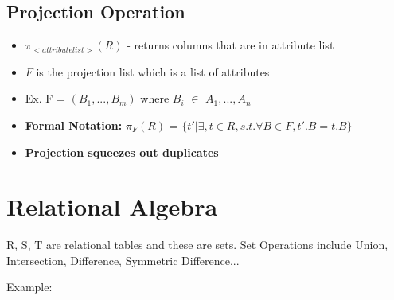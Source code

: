\documentclass[twoside]{article}
\begin{document}
\subsection*{Projection Operation}
\begin{itemize}
    \item $\pi_{<attribute list>}(R)$ - returns columns that are in attribute list
    \item $F$ is the projection list which is a list of attributes
    \item Ex. F = $(B_1,..., B_m)$ where $B_i$ $\in$ $A_1,..., A_n$
    \item \textbf{Formal Notation:} $\pi_F(R)$ = $\{t' | \exists,  t \in R, s.t. 
    \forall B \in F, t'.B=t.B\}$
    \item \textbf{Projection squeezes out duplicates}
\end{itemize}

\newpage
\hfill \break 
{}

\section*{Relational Algebra}
R, S,  T are relational tables and these are sets. Set Operations include
Union, Intersection, Difference, Symmetric Difference...

Example:
\end{document}
